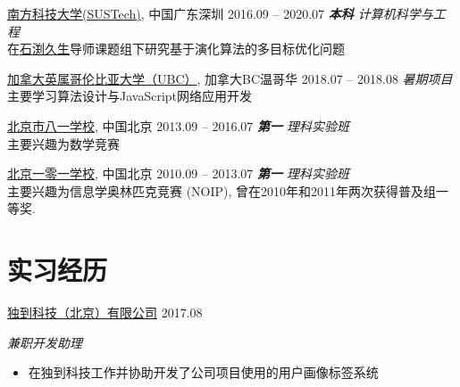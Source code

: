 \documentclass[hidelinks__VERSION__]{adamyi-cv}
\begin{document}
\begin{entrylist}


\entry
{\href{https://www.sustech.edu.cn/}{\heir 南方科技大学(SUSTech)}, \hei 中国广东深圳}
{2016.09 -- 2020.07}
{\hei \emph{\textbf{\hei 本科} 计算机科学与工程}\\
在\href{http://cse.sustc.edu.cn/en/people/view/people_id/55/sort_id/9/pid/}{\hei 石渕久生}导师课题组下研究基于演化算法的多目标优化问题
}

\entry
{\href{https://www.ubc.ca/}{\heir 加拿大英属哥伦比亚大学（UBC）}, \hei 加拿大BC温哥华}
{2018.07 -- 2018.08}
{\hei \emph{暑期项目}\\
主要学习算法设计与JavaScript网络应用开发
}

\entry
{\href{http://bayims.cn/}{\heir 北京市八一学校}, \hei 中国北京}
{2013.09 -- 2016.07}
{\hei \emph{\textbf{\heir 第一} 理科实验班}\\
主要兴趣为数学竞赛
}

\entry
{\href{http://beijing101.com}{\heir 北京一零一学校}, \hei 中国北京}
{2010.09 -- 2013.07}
{\hei \emph{\textbf{\heir 第一} \hei 理科实验班}\\
主要兴趣为信息学奥林匹克竞赛 (NOIP), 曾在2010年和2011年两次获得普及组一等奖.
}

\end{entrylist}


\section{\heir 实习\heir 经历}

\begin{entrylist}


\entry
{\href{http://www.doodod.com/}{\heir 独到科技（北京）有限公司}}
{2017.08}
{\emph{\hei 兼职开发助理}
\begin{itemize}
\item {\hei 在独到科技工作并协助开发了公司项目使用的用户画像标签系统}
\end{itemize}}


\end{entrylist}
\end{document}
